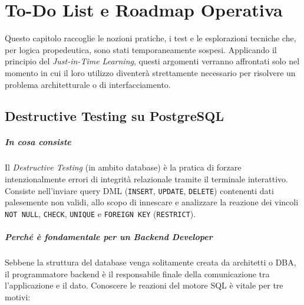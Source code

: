 \chapter{To-Do List e Roadmap Operativa}
\label{cap:todolist}

Questo capitolo raccoglie le nozioni pratiche, i test e le esplorazioni tecniche che, per logica propedeutica, sono stati temporaneamente sospesi. Applicando il principio del \textit{Just-in-Time Learning}, questi argomenti verranno affrontati solo nel momento in cui il loro utilizzo diventerà strettamente necessario per risolvere un problema architetturale o di interfacciamento.

\section{Destructive Testing su PostgreSQL}

\paragraph{In cosa consiste}
Il \textit{Destructive Testing} (in ambito database) è la pratica di forzare intenzionalmente errori di integrità relazionale tramite il terminale interattivo. Consiste nell'inviare query DML (\texttt{INSERT}, \texttt{UPDATE}, \texttt{DELETE}) contenenti dati palesemente non validi, allo scopo di innescare e analizzare la reazione dei vincoli \texttt{NOT NULL}, \texttt{CHECK}, \texttt{UNIQUE} e \texttt{FOREIGN KEY} (\texttt{RESTRICT}).

\paragraph{Perché è fondamentale per un Backend Developer}
Sebbene la struttura del database venga solitamente creata da architetti o DBA, il programmatore backend è il responsabile finale della comunicazione tra l'applicazione e il dato. Conoscere le reazioni del motore SQL è vitale per tre motivi:

